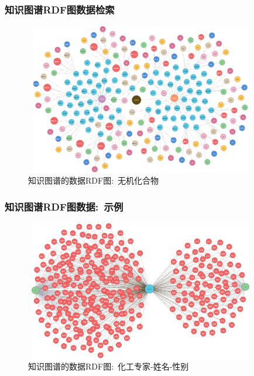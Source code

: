 \begin{frame}
	\frametitle{知识图谱\textrm{RDF}图数据检索}
\begin{figure}[h!]
\centering
\includegraphics[height=2.60in,width=4.00in,viewport=0 0 240 180,clip]{Figures/KG_Chem-Inorganic.png}
\caption{\tiny 知识图谱的数据\textrm{RDF}图:~无机化合物}%
\label{Fig:KG_Chem-Inorganic}
\end{figure}
\end{frame}

\begin{frame}
	\frametitle{知识图谱\textrm{RDF}图数据:~示例}
\begin{figure}[h!]
\centering
\includegraphics[height=2.40in,width=4.00in,viewport=0 0 150 100,clip]{Figures/KG_Chem-Chemist.png}
\caption{\tiny 知识图谱的数据\textrm{RDF}图:~化工专家-姓名-性别}%
\label{Fig:KG_Chem-Chemist}
\end{figure}
\end{frame}

